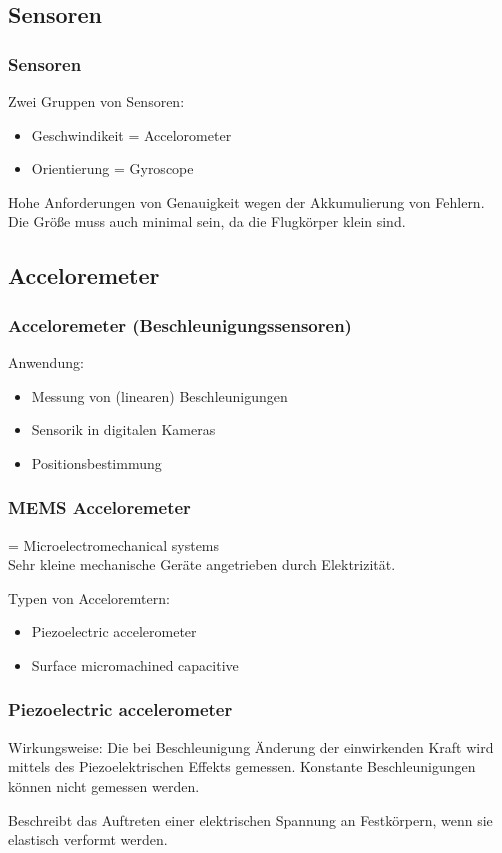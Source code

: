 \documentclass[10pt,a4paper,oneside]{beamer}
\begin{document}
\begin{frame}
	\section{Sensoren}
	\frametitle{Sensoren}
	Zwei Gruppen von Sensoren:
	\begin{itemize}
		\item Geschwindikeit = Accelorometer
		\item Orientierung = Gyroscope
	\end{itemize}
	
	Hohe Anforderungen von Genauigkeit wegen der Akkumulierung von Fehlern.\\
	Die Größe muss auch minimal sein, da die Flugkörper klein sind.

\end{frame}

\begin{frame}
  \subsection{Acceloremeter}
  \frametitle{Acceloremeter (Beschleunigungssensoren)}
  
  Anwendung:
  \begin{itemize}
    \item Messung von (linearen) Beschleunigungen
  	\item Sensorik in digitalen Kameras
  	\item Positionsbestimmung
  \end{itemize}
\end{frame}

\begin{frame}
  \frametitle{MEMS Acceloremeter}
  
  \begin{definition}[MEMS]
  = Microelectromechanical systems \\
  Sehr kleine mechanische Geräte angetrieben durch Elektrizität.
  \end{definition}
   Typen von Acceloremtern:
  \begin{itemize}
    \item Piezoelectric accelerometer
  	\item Surface micromachined capacitive
  \end{itemize}
\end{frame}

\begin{frame}
  \frametitle{Piezoelectric accelerometer}
  Wirkungsweise: Die bei Beschleunigung Änderung der einwirkenden Kraft wird mittels des Piezoelektrischen Effekts gemessen.
  Konstante Beschleunigungen können nicht gemessen werden.
    \bigskip
    \begin{definition}[Piezoelektrizität]
		Beschreibt das Auftreten einer elektrischen Spannung an Festkörpern, wenn sie elastisch verformt werden.
	\end{definition}
\end{frame}
\end{document}
